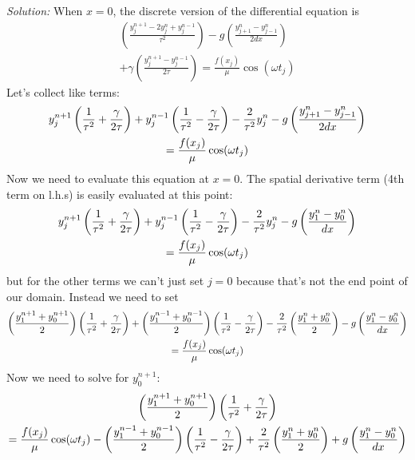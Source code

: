 \begin{enumerate}
\begin{enumerate}
\ifsolutions
\textit{Solution:}
When $x = 0$, the discrete version of the differential equation is
\begin{multline}
  \left(\frac{y_j^{n+1} - 2 y_j^n + y_j^{n-1}}{\tau^2}\right) - g
  \left( \frac{y_{j+1}^n - y_{j-1}^n}{2 dx}\right) \\ + \gamma
  \left( \frac{y_j^{n+1} - y_j^{n-1}}{2 \tau}\right) = \frac{f(x_j)}{\mu} \cos
  (\omega t_j)
\end{multline}
Let's collect like terms:
\begin{multline}
  y_j^{n+1} \left( {1\over \tau^2} + {\gamma \over 2 \tau}\right)  +
  y_j^{n-1}\left( {1\over \tau^2} - {\gamma \over 2 \tau}\right) - {2\over
      \tau^2} y_j^n - g \left( \frac{y_{j+1}^n - y_{j-1}^n}{2 dx}\right)\\ = \frac{f(x_j)}{\mu} \cos
  (\omega t_j)
\end{multline}
Now we need to evaluate this equation at $x = 0$.  The spatial
derivative term (4th term on l.h.s) is easily evaluated at this point:
\begin{multline}
  y_j^{n+1} \left( {1\over \tau^2} + {\gamma \over 2 \tau}\right)  +
  y_j^{n-1}\left( {1\over \tau^2} - {\gamma \over 2 \tau}\right) - {2\over
      \tau^2} y_j^n - g \left( \frac{y_1^n - y_0^n}{ dx}\right)\\ = \frac{f(x_j)}{\mu} \cos
  (\omega t_j)
\end{multline}
but for the other terms we can't just set $j = 0$ because that's not
the end point of our domain.  Instead we need to set 
\begin{multline}
\left(  \frac{y_1^{n + 1} + y_0^{n+1}}{2}\right) \left( {1\over \tau^2} + {\gamma \over 2 \tau}\right)  +
  \left(\frac{y_1^{n - 1} + y_0^{n-1}}{2}\right)\left( {1\over \tau^2} - {\gamma \over 2 \tau}\right) - {2\over
      \tau^2} \left(\frac{y_1^n + y_0^n}{2}\right) - g \left( \frac{y_1^n - y_0^n}{ dx}\right)\\ = \frac{f(x_j)}{\mu} \cos
  (\omega t_j)
\end{multline}
Now we need to solve for $y_0^{n+1}$:
\begin{multline}
  \left(  \frac{y_1^{n + 1} + y_0^{n+1}}{2}\right) \left( {1\over \tau^2} + {\gamma \over 2 \tau}\right)  \\ = \frac{f(x_j)}{\mu} \cos
  (\omega t_j) - \left(  \frac{y_1^{n - 1} + y_0^{n - 1}}{2}\right)\left( {1\over \tau^2} - {\gamma \over 2 \tau}\right) + {2\over
      \tau^2} \left(  \frac{y_1^n + y_0^n}{2}\right) + g \left( \frac{y_1^n - y_0^n}{ dx}\right)

\end{multline}
\end{enumerate}
\end{enumerate}
